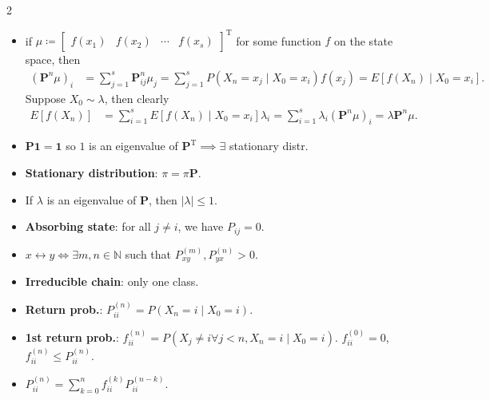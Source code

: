 \documentclass[8pt]{article}
\newcommand{\abs}[1]{\left\lvert#1\right\rvert}
\begin{document}
\begin{multicols*}{2}
\begin{itemize}
            \begin{equation*}
                P^{0, m + n}_{ij} = \sum_{k \in S}P^{0, m}_{ik}P^{0, n}_{kj},
            \end{equation*}
            and $P\left(X_n = j \mid X_0 = i\right) = \left(\bm{P}^n\right)_{ij}$.
            \item if $\mu \coloneqq \begin{bmatrix}
                f\left(x_1\right) & f\left(x_2\right) & \cdots & f\left(x_s\right)
            \end{bmatrix}^{\mathrm{T}}$ for some function $f$ on the state space, then 
            \begin{align*}
                \left(\bm{P}^n\mu\right)_i & = \sum_{j = 1}^{s}\bm{P}^n_{ij}\mu_j = \sum_{j = 1}^{s}P\left(X_n = x_j \mid X_0 = x_i\right)f\left(x_j\right) = E\left[f\left(X_n\right) \mid X_0 = x_i\right].
            \end{align*}
            Suppose $X_0 \sim \lambda$, then clearly 
            \begin{align*}
                E\left[f\left(X_n\right)\right] & = \sum_{i = 1}^{s}E\left[f\left(X_n\right) \mid X_0 = x_i\right]\lambda_i = \sum_{i = 1}^{s}\lambda_i\left(\bm{P}^n\mu\right)_i = \lambda\bm{P}^n\mu.
            \end{align*}
            \item $\bm{P}\mathbf{1} = \mathbf{1}$ so $1$ is an eigenvalue of $\bm{P}^{\mathrm{T}} \implies \exists$ stationary distr.
            \item \textbf{Stationary distribution}: $\pi = \pi\bm{P}$.
            \item If $\lambda$ is an eigenvalue of $\bm{P}$, then $\abs{\lambda} \leq 1$.
            \item \textbf{Absorbing state}: for all $j \neq i$, we have $P_{ij} = 0$.
            \item $x \leftrightarrow y \iff \exists m, n \in \mathbb{N}$ such that $P_{xy}^{\left(m\right)}, P_{yx}^{\left(n\right)} > 0$.
            \item \textbf{Irreducible chain}: only one class.
            \item \textbf{Return prob.}: $P_{ii}^{\left(n\right)} = P\left(X_n = i \mid X_0 = i\right)$.
            \item \textbf{1st return prob.}: $f_{ii}^{\left(n\right)} = P\left(X_j \neq i \forall j < n, X_n = i \mid X_0 = i\right)$. $f_{ii}^{\left(0\right)} = 0$, $f_{ii}^{\left(n\right)} \leq P_{ii}^{\left(n\right)}$.
            \item $P_{ii}^{\left(n\right)} = \sum_{k = 0}^{n}f_{ii}^{\left(k\right)}P_{ii}^{\left(n - k\right)}$.

\end{itemize}
\end{multicols*}
\end{document}
